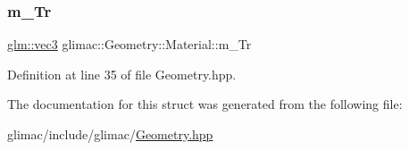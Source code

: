 \subsubsection{\texorpdfstring{m\+\_\+\+Tr}{m\_Tr}}
{\footnotesize\ttfamily \hyperlink{group__core__types_ga1c47e8b3386109bc992b6c48e91b0be7}{glm\+::vec3} glimac\+::\+Geometry\+::\+Material\+::m\+\_\+\+Tr}



Definition at line 35 of file Geometry.\+hpp.



The documentation for this struct was generated from the following file\+:\begin{DoxyCompactItemize}
\item 
glimac/include/glimac/\hyperlink{_geometry_8hpp}{Geometry.\+hpp}\end{DoxyCompactItemize}
